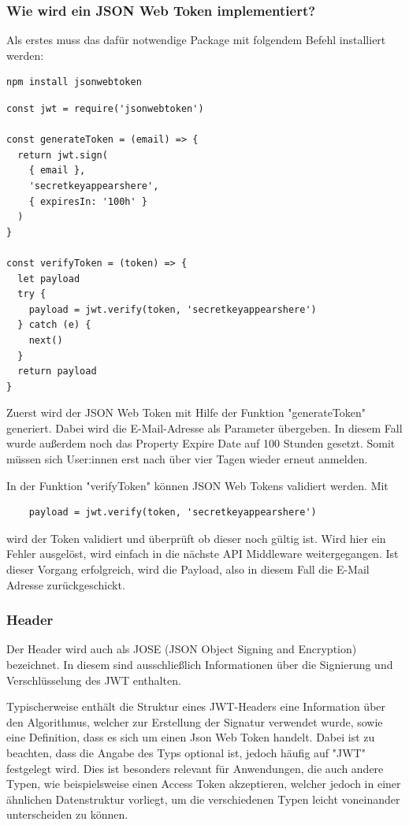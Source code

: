 \subsubsection{Wie wird ein JSON Web Token implementiert?}

Als erstes muss das dafür notwendige Package mit folgendem Befehl installiert werden:

\begin{lstlisting}
npm install jsonwebtoken
\end{lstlisting}


\begin{lstlisting}[caption=Implementierung JWT]
const jwt = require('jsonwebtoken')

const generateToken = (email) => {
  return jwt.sign(
    { email },
    'secretkeyappearshere',
    { expiresIn: '100h' }
  )
}

const verifyToken = (token) => {
  let payload
  try {
    payload = jwt.verify(token, 'secretkeyappearshere')
  } catch (e) {
    next()
  }
  return payload
}
\end{lstlisting}

Zuerst wird der JSON Web Token mit Hilfe der Funktion "generateToken" generiert. Dabei wird die E-Mail-Adresse als Parameter übergeben. In diesem Fall wurde außerdem noch das Property Expire Date auf 100 Stunden gesetzt. Somit müssen sich User:innen erst nach über vier Tagen wieder erneut anmelden.

In der Funktion "verifyToken" können JSON Web Tokens validiert werden. Mit

\begin{lstlisting}
    payload = jwt.verify(token, 'secretkeyappearshere')
\end{lstlisting}

wird der Token validiert und überprüft ob dieser noch gültig ist. Wird hier ein Fehler ausgelöst, wird einfach in die nächste API Middleware weitergegangen. Ist dieser Vorgang erfolgreich, wird die Payload, also in diesem Fall die E-Mail Adresse zurückgeschickt.\cite{JWT_2}


\subsubsection{Header}

Der Header wird auch als JOSE (JSON Object Signing and Encryption) bezeichnet. In diesem sind ausschließlich Informationen über die Signierung und Verschlüsselung des JWT enthalten.


Typischerweise enthält die Struktur eines JWT-Headers eine Information über den Algorithmus, welcher zur Erstellung der Signatur verwendet wurde, sowie eine Definition, dass es sich um einen Json Web Token handelt. Dabei ist zu beachten, dass die Angabe des Typs optional ist, jedoch häufig auf "JWT" festgelegt wird. Dies ist besonders relevant für Anwendungen, die auch andere Typen, wie beispielsweise einen Access Token akzeptieren, welcher jedoch in einer ähnlichen Datenstruktur vorliegt, um die verschiedenen Typen leicht voneinander unterscheiden zu können.

